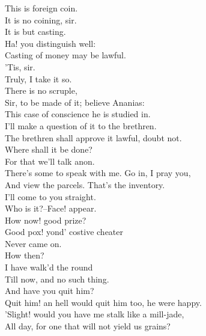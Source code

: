 \documentclass{memoir}
\begin{document}
\begin{drama*}
 This is foreign coin.\\
\subtlespeaks {} It is no coining, sir.\\
 It is but casting.\\
\tribulationspeaks {} Ha! you distinguish well:\\
 Casting of money may be lawful.\\
\ananiasspeaks {} 'Tis, sir.\\
\tribulationspeaks  Truly, I take it so.\\
\subtlespeaks {} There is no scruple,\\
 Sir, to be made of it; believe Ananias:\\
 This case of conscience he is studied in.\\
\tribulationspeaks  I'll make a question of it to the brethren.\\
\ananiasspeaks  The brethren shall approve it lawful, doubt not.\\
 Where shall it be done?\\
\subtlespeaks {} For that we'll talk anon.\\
 There's some to speak with me. Go in, I pray you,\\
 And view the parcels. That's the inventory.\\
 I'll come to you straight.\\
 Who is it?--Face! appear.\\
 How now! good prize?\\
\facespeaks {} Good pox! yond' costive cheater\\
 Never came on.\\
\subtlespeaks {} How then?\\
\facespeaks {} I have walk'd the round\\
 Till now, and no such thing.\\
\subtlespeaks {} And have you quit him?\\
\facespeaks  Quit him! an hell would quit him too, he were happy.\\
 'Slight! would you have me stalk like a mill-jade,\\
 All day, for one that will not yield us grains?\\

\end{drama*}
\end{document}
